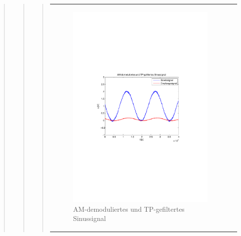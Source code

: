 \begin{quote}
\begin{quote}
\begin{quote}
\begin{center}
\begin{tabular}{ll}
                \hspace{-14em}
                    \begin{minipage}{0.6\textwidth}
    
                        \begin{figure}[H]
                            \label{fig:}
                            \includegraphics[scale=0.5, trim = 2cm 6.5cm 1.5cm
                            8.5cm, clip]{./Bilder/synchDemodFilter_sinus} %
                            \caption{AM-demoduliertes und
                            TP-gefiltertes Sinussignal}
                        \end{figure}
    
                    \end{minipage}
                    \begin{minipage}{0.6\textwidth}
    

\end{minipage}
\end{tabular}
\end{center}
\end{quote}
\end{quote}
\end{quote}
